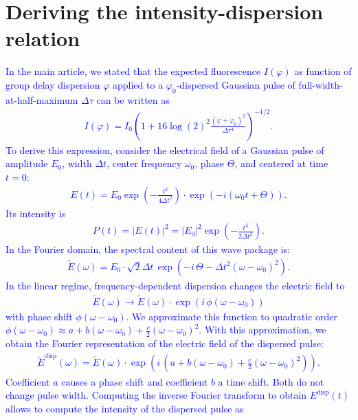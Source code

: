 \documentclass[10pt,letterpaper]{article}
\newcommand{\complexi}{i}
\begin{document}
\section{Deriving the intensity-dispersion relation}
\textcolor{blue}{In the main article, we stated that the expected fluorescence $I(\varphi)$ as function of group delay dispersion $\varphi$ applied to a $\varphi_0$-dispersed Gaussian pulse of full-width-at-half-maximum $\Delta\tau$ can be written as
\begin{eqnarray}
    I(\varphi)=I_0 \left(1+16\log(2)^2\frac{(\varphi+\varphi_0)^2}{\Delta\tau^4}\right)^{-1/2}\label{main}.
\end{eqnarray}
To derive this expression, consider the electrical field of a Gaussian pulse of amplitude $E_0$, width $\Delta t$, center frequency $\omega_0$, phase $\Theta$, and centered at time $t=0$:
\begin{eqnarray}
E(t)=E_0\exp\left(-\frac{t^2}{4\Delta t^2}\right)\cdot\exp\left(-\complexi\left(\omega_0 t + \Theta\right)\right).
\end{eqnarray}
Its intensity is 
\begin{eqnarray}
P(t) = |E(t)|^2 = |E_0|^2 \exp\left(-\frac{t^2}{2\Delta t^2}\right)\label{intens}.
\end{eqnarray}
In the Fourier domain, the spectral content of this wave package is:
\begin{eqnarray}
\tilde{E}(\omega)=E_0\cdot\sqrt{2}\Delta t\, \exp\left(-\complexi\,\Theta -\Delta t^2(\omega - \omega_0)^2\right).
\end{eqnarray}
In the linear regime, frequency-dependent dispersion changes the electric field to
\begin{eqnarray}
\tilde{E}(\omega)\to\tilde{E}(\omega)\cdot\exp\left(\complexi\,\phi(\omega-\omega_0)\right)
\end{eqnarray}
with phase shift $\phi(\omega-\omega_0)$. We approximate this function to quadratic order $\phi(\omega-\omega_0)\approx a + b(\omega-\omega_0) + \frac{c}{2}(\omega-\omega_0)^2$. With this approximation, we obtain the Fourier representation of the electric field of the dispersed pulse:
\begin{eqnarray}
\tilde{E}^\text{disp}(\omega)=\tilde{E}(\omega)\cdot\exp\left(\complexi\,\left(a + b(\omega-\omega_0) + \frac{c}{2}(\omega-\omega_0)^2\right)\right).
\end{eqnarray}
Coefficient $a$ causes a phase shift and coefficient $b$ a time shift. Both do not change pulse width. Computing the inverse Fourier transform to obtain $E^\text{disp}(t)$ allows to compute the intensity of the dispersed pulse as 
}
\end{document}
